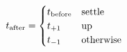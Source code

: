 \documentclass[12pt]{article}
\begin{document}
\[\begin{array}{@{}l@{}}
  t_{\mathrm{after}} = \begin{cases}
      t_{\mathrm{before}} & \text{settle} \\
      t_{+1}              & \text{up} \\
      t_{-1}              & \text{otherwise}
    \end{cases}
\end{array}\]
\end{document}
